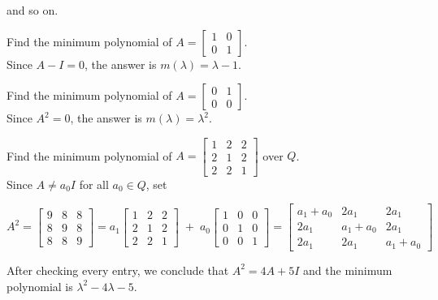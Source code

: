\documentclass[a4paper]{article}
\theoremstyle{plain} %
{\theorembodyfont{\normalfont}
\newtheorem{Exa}{Example}}
\def\mp{minimum polynomial }
\begin{document}
and so on.

\begin{Exa}
Find the \mp of $A = \left[ \begin{array}{cc} 1 & 0
\\ 0 & 1 \end{array} \right]$. \\%
\vspace{0.5\baselineskip} %
Since $A-I=0$, the answer is $m(\lambda)=\lambda -1$.
\end{Exa}

\begin{Exa}
Find the \mp of $A = \left[ \begin{array}{cc} 0 & 1
\\ 0 & 0 \end{array} \right]$. \\%
\vspace{0.5\baselineskip} %
Since $A^2=0$, the answer is $m(\lambda)={\lambda}^2$.
\end{Exa}

\begin{Exa}\label{ex3}
Find the minimum polynomial of $A = \left[
\begin{array}{ccc} 1 & 2 & 2\\
2 & 1 & 2 \\ 2 & 2 & 1 \end{array} \right]$ over $Q$. \\ %

Since $A \neq a_0I$ for all $a_0 \in Q$, set%

\vspace{0.5\baselineskip} %

     $A^2 = \left[ \begin{array}{ccc}
            9 & 8 & 8 \\
            8 & 9 & 8 \\
            8 & 8 & 9
       \end{array} \right]
        = a_1 \! \left[ \begin{array}{ccc}
            1 & 2 & 2 \\
            2 & 1 & 2 \\
            2 & 2 & 1
       \end{array} \right]
       \; + \; a_0 \! \left[\begin{array}{ccc}
            1 & 0 & 0 \\
            0 & 1 & 0 \\
            0 & 0 & 1
       \end{array}\right]
       = \left[ \begin{array}{ccc}
            a_1\!+\!a_0 & 2a_1 & 2a_1 \\
            2a_1 & a_1\!+\!a_0 & 2a_1\\
            2a_1 & 2a_1 & a_1\!+\!a_0
       \end{array} \right]$

\vspace{0.5\baselineskip}

After checking every entry, we conclude that $A^2 = 4A + 5I$ and
the minimum polynomial is ${\lambda}^2 -4\lambda - 5$.

\end{Exa}
\end{document}
